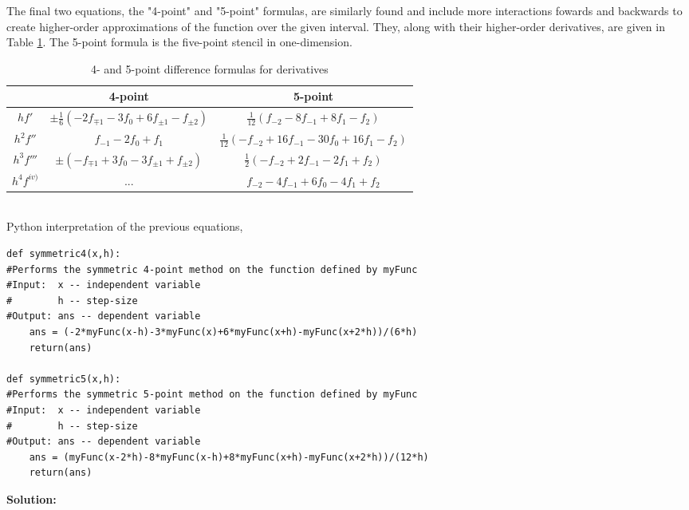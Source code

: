\documentclass[10pt]{article}
\begin{document}
The final two equations, the "4-point" and "5-point" formulas, are similarly found and include more interactions fowards and backwards to create higher-order approximations of the function over the given interval. They, along with their higher-order derivatives, are given in Table \ref{tab:differentiation}. The 5-point formula is the five-point stencil in one-dimension. \\
\begin{table}[!h]
	\begin{center}
	\caption{4- and 5-point difference formulas for derivatives}
		\label{tab:differentiation}
		\begin{tabular}{|ccc|}
		\hline
		& 4-point & 5-point \\
		\hline
		$hf'$ & $\pm\frac{1}{6}(-2f_{\mp1} - 3f_{0} + 6f_{\pm 1} - f_{\pm 2})$ & $\frac{1}{12}(f_{-2} - 8f_{-1} + 8f_{1} -f_{2})$ \\
		$h^{2}f'' $ & $f_{-1} - 2f_{0} + f_{1}$ & $\frac{1}{12}(-f_{-2}+16f_{-1} - 30 f_{0} +16f_{1} -f_{2})$ \\
		$h^{3}f'''$ & $\pm(-f_{\mp 1} + 3 f_{0} - 3 f_{\pm 1} + f_{\pm 2 })$ & $\frac{1}{2}(-f_{-2} + 2f_{-1} - 2f_{1} + f_{2})$ \\
		$h^{4}f^{iv)} $ & ... & $f_{-2} - 4 f_{-1} + 6 f_{0} -4f_{1} + f_{2}$ \\
		\hline
		\end{tabular}
	\end{center}
\end{table} \\
Python interpretation of the previous equations,
\begin{lstlisting}
def symmetric4(x,h):
#Performs the symmetric 4-point method on the function defined by myFunc
#Input:  x -- independent variable
#        h -- step-size
#Output: ans -- dependent variable
    ans = (-2*myFunc(x-h)-3*myFunc(x)+6*myFunc(x+h)-myFunc(x+2*h))/(6*h)
    return(ans)

def symmetric5(x,h):
#Performs the symmetric 5-point method on the function defined by myFunc
#Input:  x -- independent variable
#        h -- step-size
#Output: ans -- dependent variable
    ans = (myFunc(x-2*h)-8*myFunc(x-h)+8*myFunc(x+h)-myFunc(x+2*h))/(12*h)
    return(ans)
\end{lstlisting}
\textbf{Solution:}
\end{document}
